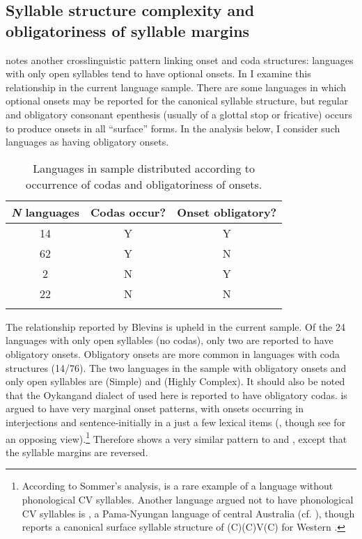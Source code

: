 \subsection{Syllable structure complexity and obligatoriness of syllable margins}\label{sec:3.3.3}

  \citet[336]{Blevins2006} notes another crosslinguistic pattern linking onset and coda structures: languages with only open syllables tend to have optional onsets. In  I examine this relationship in the current language sample. There are some languages in which optional onsets may be reported for the canonical syllable structure, but regular and obligatory consonant epenthesis (usually of a glottal stop or fricative) occurs to produce onsets in all ``surface'' forms. In the analysis below, I consider such languages as having obligatory onsets.

\begin{table}
\begin{tabular}{ccc}
\lsptoprule
 \textit{N} languages & Codas occur? & Onset obligatory?\\\midrule
 14 & Y & Y\\
 62 & Y & N\\
 \phantom{1}2 & N & Y\\
 22 & N & N\\
\lspbottomrule
\end{tabular}
\caption{\label{tab:3.3}Languages in sample distributed according to occurrence of codas and obligatoriness of onsets.}
\end{table}

  The relationship reported by Blevins is upheld in the current sample. Of the 24 languages with only open syllables (no codas), only two are reported to have obligatory onsets. Obligatory onsets are more common in languages with coda structures (14/76). The two languages in the sample with obligatory onsets and only open syllables are  (Simple) and  (Highly Complex). It should also be noted that the Oykangand dialect of  used here is reported to have obligatory codas.  is argued to have very marginal onset patterns, with onsets occurring in interjections and sentence-initially in a just a few lexical items (\citealt{Sommer1969,Sommer1970,Sommer1981}, though see \citealt{Dixon1970} for an opposing view).\footnote{{According to Sommer’s analysis,  is a rare example of a language without phonological CV syllables. Another language argued not to have phonological CV syllables is , a Pama-Nyungan language of central Australia (cf. \citealt{BreenPensalfini1999}), though \citet{Anderson2000} reports a canonical surface syllable structure of (C)(C)V(C) for Western .}} Therefore  shows a very similar pattern to  and , except that the syllable margins are reversed.

